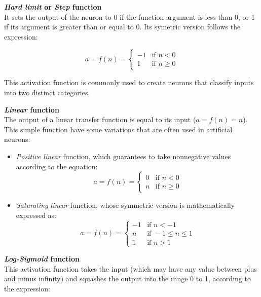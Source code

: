 \begin{description}
	\item{\textbf{\emph{Hard limit} or \emph{Step} function}\hfill \\

	It sets the output of the neuron to 0 if the function argument
	is less than 0, or 1 if its argument is greater than or equal
	to 0. Its symetric version follows the expression:

		\begin{equation}
		a = f(n) =
  			\begin{cases}
    			-1 & \text{if } n < 0\\
    			1 & \text{if } n \geq 0
  			\end{cases}
		\label{eq:hardlimit}
		\end{equation}

	This activation function is commonly used to create neurons
	that classify inputs into two distinct categories.

	}
	\item{\textbf{\emph{Linear} function}\hfill \\

	The output of a linear transfer function is equal to its input
	($a=f(n)=n$). This simple function have some variations that
	are often used in artificial neurons:

	\begin{itemize}
		\item \emph{Positive linear} function, which guarantees to take nonnegative values according to the equation:
		\begin{equation}
		a = f(n) =
  			\begin{cases}
    			0 & \text{if } n < 0\\
    			n & \text{if } n \geq 0
  			\end{cases}
		\label{eq:positivelinear}
		\end{equation}

		\item \emph{Saturating linear} function, whose symmetric version is mathematically expressed as:
		\begin{equation}
		a = f(n) =
  			\begin{cases}
    			-1 & \text{if } n < -1\\
    			n & \text{if } -1 \leq n \leq 1\\
    			1 & \text{if } n > 1
  			\end{cases}
		\label{eq:saturatinglinear}
		\end{equation}
	\end{itemize}
	}
	\item{\textbf{\emph{Log-Sigmoid} function}\hfill \\
	This activation function takes the input (which may have any value between plus and minus infinity) and squashes the output into the range 0 to 1, according to the expression:

}
\end{description}
